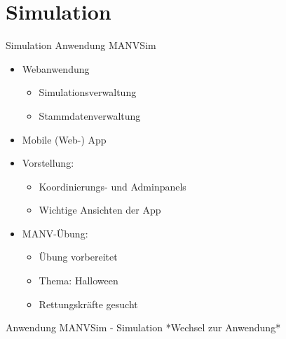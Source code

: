
\section{Simulation}

\begin{frame}{Simulation}
	Anwendung MANVSim
	\begin{itemize}
		\item Webanwendung
		\begin{itemize}
			\item Simulationsverwaltung
			\item Stammdatenverwaltung
		\end{itemize}
		\item Mobile (Web-) App
		\item Vorstellung:
		\begin{itemize}
			\item Koordinierungs- und Adminpanels
			\item Wichtige Ansichten der App
		\end{itemize}
		\item MANV-Übung:
		\begin{itemize}
			\item Übung vorbereitet
			\item Thema: Halloween
			\item Rettungskräfte gesucht
		\end{itemize}
	\end{itemize}
\end{frame}

\begin{frame}{Anwendung MANVSim - Simulation}
	*Wechsel zur Anwendung*
\end{frame}
